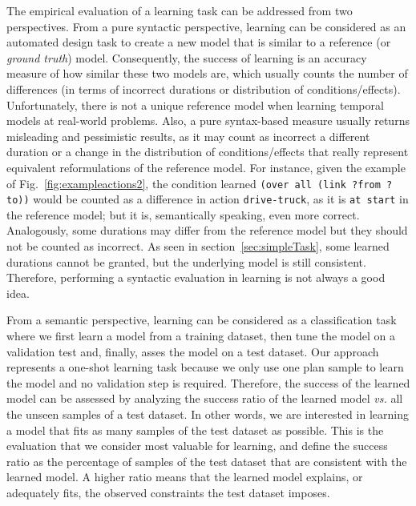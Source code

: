 \documentclass{ecai}
\begin{document}
The empirical evaluation of a learning task can be addressed from two perspectives. From a pure syntactic perspective, learning can be considered as an automated design task to create a new model that is similar to a reference (or {\em ground truth}) model. Consequently, the success of learning is an accuracy measure of how similar these two models are, which usually counts the number of differences (in terms of incorrect durations or distribution of conditions/effects). Unfortunately, there is not a unique reference model when learning temporal models at real-world problems. Also, a pure syntax-based measure usually returns misleading and pessimistic results, as it may count as incorrect a different duration or a change in the distribution of conditions/effects that really represent equivalent reformulations of the reference model. For instance, given the example of Fig.~\ref{fig:exampleactions2}, the condition learned \texttt{(over all (link ?from ?to))} would be counted as a difference in action \texttt{drive-truck}, as it is \texttt{at start} in the reference model; but it is, semantically speaking, even more correct. Analogously, some durations may differ from the reference model but they should not be counted as incorrect. As seen in section~\ref{sec:simpleTask}, some learned durations cannot be granted, but the underlying model is still consistent. Therefore, performing a syntactic evaluation in learning is not always a good idea.

From a semantic perspective, learning can be considered as a classification task where we first learn a model from a training dataset, then tune the model on a validation test and, finally, asses the model on a test dataset. Our approach represents a one-shot learning task because we only use one plan sample to learn the model and no validation step is required.
Therefore, the success of the learned model can be assessed by analyzing the success ratio of the learned model \emph{vs.} all the unseen samples of a test dataset. In other words, we are interested in learning a model that fits as many samples of the test dataset as possible. This is the evaluation that we consider most valuable for learning, and define the success ratio as the percentage of samples of the test dataset that are consistent with the learned model. A higher ratio means that the learned model explains, or adequately fits, the observed constraints the test dataset imposes.
\end{document}
